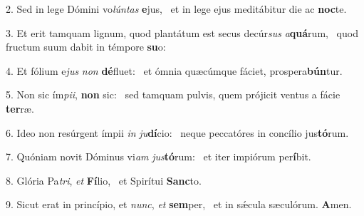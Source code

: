 2. Sed in lege Dómini vo\textit{lún}\textit{tas} \textbf{e}jus, \ast\  et in lege ejus meditábitur die ac \textbf{noc}te.\

3. Et erit tamquam lignum, quod plantátum est secus decúr\textit{sus} \textit{a}\textbf{quá}rum, \ast\  quod fructum suum dabit in témpore \textbf{su}o:\

4. Et fólium e\textit{jus} \textit{non} \textbf{dé}fluet: \ast\  et ómnia quæcúmque fáciet, prospera\textbf{bún}tur.\

5. Non sic ím\textit{pi}\textit{i}, \textbf{non} sic: \ast\  sed tamquam pulvis, quem prójicit ventus a fácie \textbf{ter}ræ.\

6. Ideo non resúrgent ímpii \textit{in} \textit{ju}\textbf{dí}cio: \ast\  neque peccatóres in concílio jus\textbf{tó}rum.\

7. Quóniam novit Dóminus vi\textit{am} \textit{jus}\textbf{tó}rum: \ast\  et iter impiórum per\textbf{í}bit.\

8. Glória Pa\textit{tri}, \textit{et} \textbf{Fí}lio, \ast\  et Spirítui \textbf{Sanc}to.\

9. Sicut erat in princípio, et \textit{nunc}, \textit{et} \textbf{sem}per, \ast\  et in sǽcula sæculórum. \textbf{A}men.\

